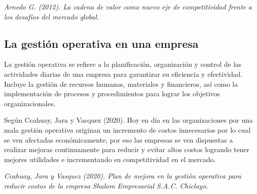 \documentclass{article}
\newenvironment{marcoTeorico}{}{}
\begin{document}
\begin{marcoTeorico}
  \begin{flushright}
    \textit{Arnedo G. (2012). La cadena de valor como nuevo eje de competitividad frente a los desafíos del mercado global.}
  \end{flushright}

  \subsection{La gestión operativa en una empresa}

  La gestión operativa se refiere a la planificación, organización y control de las actividades diarias de una empresa para garantizar su eficiencia y efectividad. Incluye la gestión de recursos humanos, materiales y financieros, así como la implementación de procesos y procedimientos para lograr los objetivos organizacionales.

  Según Ccahuay, Jara y Vasquez (2020). Hoy en día en las organizaciones por una mala gestión operativa originan un incremento de costos innecesarios  por  lo  cual  se  ven  afectadas económicamente,  por  eso  las  empresas  se  ven  dispuestas  a realizar  mejoras  continuamente  para  reducir  y  evitar  altos  costos  logrando  tener mejores  utilidades  e incrementando su competitividad en el mercado.

  \begin{flushright}
    \textit{Ccahuay, Jara y Vasquez (2020). Plan de mejora en la gestión operativa para reducir costos de la empresa Shalom Empresarial S.A.C. Chiclayo.}
  \end{flushright}
\end{marcoTeorico}

\newpage
\end{document}
